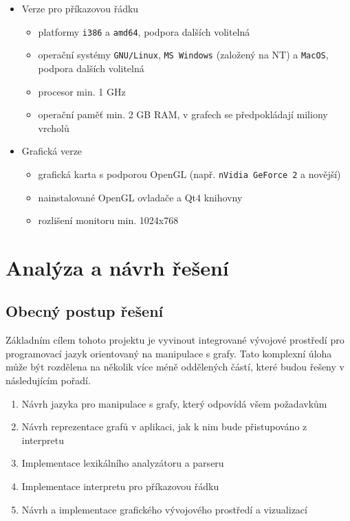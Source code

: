 \documentclass[11pt,twoside,a4paper]{book}
\begin{document}
\begin{itemize}
	\item Verze pro příkazovou řádku
		\begin{itemize}
		\item platformy \texttt{i386} a \texttt{amd64}, podpora dalších volitelná
		\item operační systémy \texttt{GNU/Linux}, \texttt{MS Windows} (založený na NT) a \texttt{MacOS}, podpora dalších volitelná
		\item procesor min. 1 GHz
		\item operační paměť min. 2 GB RAM, v grafech se předpokládají miliony vrcholů
		\end{itemize}

	\item Grafická verze
		\begin{itemize}
		\item grafická karta s podporou OpenGL (např. \texttt{nVidia GeForce 2} a novější)
		\item nainstalované OpenGL ovladače a Qt4 knihovny
		\item rozlišení monitoru min. 1024x768
		\end{itemize}
\end{itemize}



\chapter{Analýza a návrh řešení}


\section{Obecný postup řešení}

Základním cílem tohoto projektu je vyvinout integrované vývojové prostředí pro programovací jazyk orientovaný na manipulace s grafy. Tato komplexní úloha může být rozdělena na několik více méně oddělených částí, které budou řešeny v následujícím pořadí.

\begin{enumerate}
\item Návrh jazyka pro manipulace s grafy, který odpovídá všem požadavkům
\item Návrh reprezentace grafů v aplikaci, jak k nim bude přistupováno z interpretu
\item Implementace lexikálního analyzátoru a parseru
\item Implementace interpretu pro příkazovou řádku
\item Návrh a implementace grafického vývojového prostředí a vizualizací
\end{enumerate}
\end{document}
